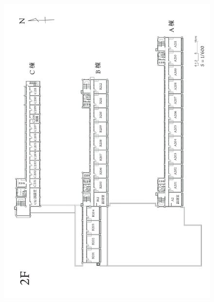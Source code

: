 \newpage
\begin{figure}[bh]
\centering
\includegraphics[]{gazo/熊野寮建物図面_ver.2_page-0003.jpg}
\end{figure}

